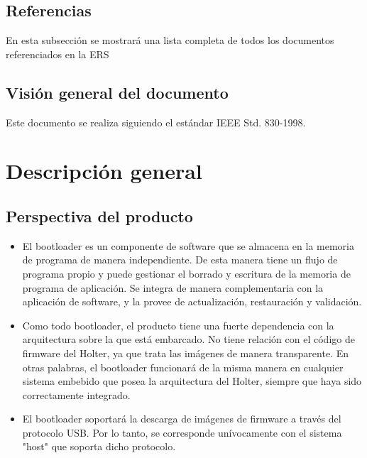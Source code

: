 \documentclass[12pt,a4paper]{article}
\begin{document}
\subsection{Referencias}
\label{sec:references}

En esta subsección se mostrará una lista completa de todos los
documentos referenciados en la ERS


\subsection{Visión general del documento}
\label{sec:overview}

Este documento se realiza siguiendo el estándar IEEE Std. 830-1998.


\section{Descripción general}
\label{sec:general_description}


\subsection{Perspectiva del producto}
\label{sec:product_perspective}

\begin{itemize}
	\item El bootloader es un componente de software que se almacena en la memoria de programa de manera independiente. De esta manera tiene un flujo 	de programa propio y puede gestionar el borrado y escritura de la memoria de programa de aplicación. Se integra de manera complementaria con la 		aplicación de software, y la provee de actualización, restauración y validación.
	
	\item Como todo bootloader, el producto tiene una fuerte dependencia con la arquitectura sobre la que está embarcado. 
	No tiene relación con el código de firmware del Holter, ya que trata las imágenes de manera transparente. En otras palabras, el bootloader 
	funcionará de la misma manera en cualquier sistema embebido que posea la arquitectura del Holter, siempre que haya sido correctamente integrado.
	
	\item El bootloader soportará la descarga de imágenes de firmware a través del protocolo USB. Por lo tanto, se corresponde unívocamente 
	con el sistema "host" que soporta dicho protocolo.
\end{itemize}
\end{document}
